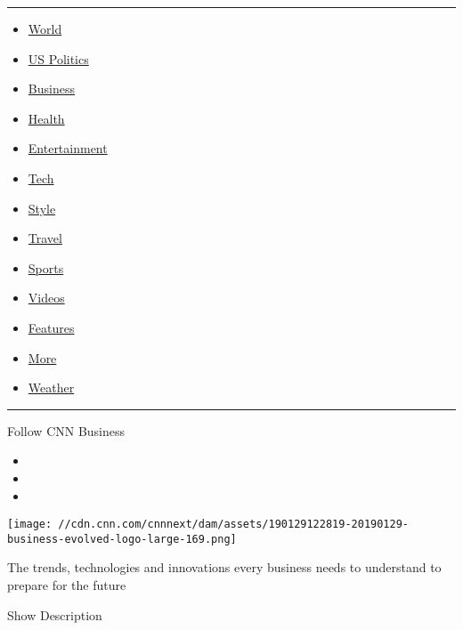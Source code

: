 \begin{center}\rule{0.5\linewidth}{\linethickness}\end{center}

\begin{itemize}
\tightlist
\item
  \href{/world}{World}
\item
  \href{/politics}{US Politics}
\item
  \href{/business}{Business}
\item
  \href{/health}{Health}
\item
  \href{/entertainment}{Entertainment}
\item
  \href{/business/tech}{Tech}
\item
  \href{/style}{Style}
\item
  \href{/travel}{Travel}
\item
  \href{/sport}{Sports}
\item
  \href{/videos}{Videos}
\item
  \href{/specials}{Features}
\item
  \href{/more}{More}
\item
  \href{/weather}{Weather}
\end{itemize}

\begin{center}\rule{0.5\linewidth}{\linethickness}\end{center}

Follow CNN Business

\begin{itemize}
\item
\item
\item
\end{itemize}

\texttt{[image: //cdn.cnn.com/cnnnext/dam/assets/190129122819-20190129-business-evolved-logo-large-169.png]}

The trends, technologies and innovations every business needs to
understand to prepare for the future

Show Description

